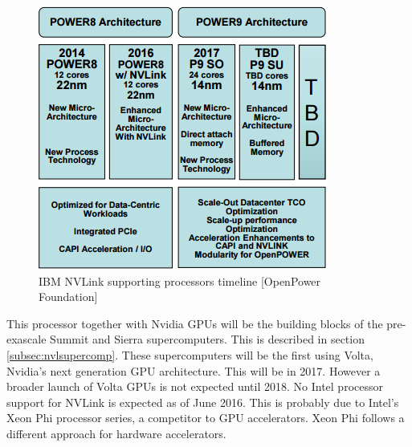 \begin{figure}[ht!]
    \centering
    \includegraphics[width=\linewidth]{NVLink_Power}
    \caption{IBM NVLink supporting processors timeline [OpenPower Foundation]}
    \label{fig:nvlpower}
\end{figure}

This processor together with Nvidia GPUs will be the building blocks of the pre-exascale Summit and Sierra supercomputers.
This is described in section \ref{subsec:nvlsupercomp}.
These supercomputers will be the first using Volta, Nvidia's next generation GPU architecture.
This will be in 2017.
However a broader launch of Volta GPUs is not expected until 2018.
No Intel processor support for NVLink is expected as of June 2016.
This is probably due to Intel's Xeon Phi processor series, a competitor to GPU accelerators.
Xeon Phi follows a different approach for hardware accelerators.

